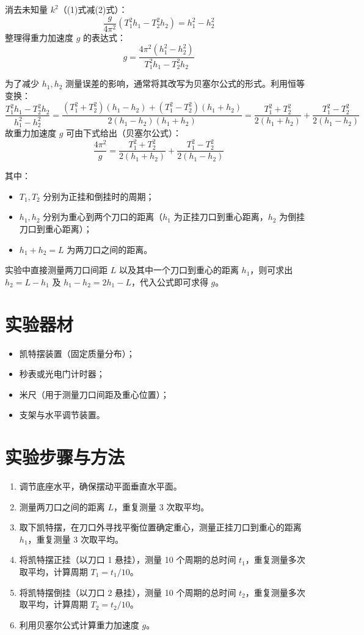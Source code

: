 \documentclass[12pt,a4paper]{article}
\begin{document}
消去未知量 $k^2$（(1)式减(2)式）：
\[ \frac{g}{4\pi^2} (T_1^2 h_1 - T_2^2 h_2) = h_1^2 - h_2^2 \]
整理得重力加速度 $g$ 的表达式：
\[ g = \frac{4\pi^2 (h_1^2 - h_2^2)}{T_1^2 h_1 - T_2^2 h_2} \]

为了减少 $h_1, h_2$ 测量误差的影响，通常将其改写为贝塞尔公式的形式。利用恒等变换：
\[ \frac{T_1^2 h_1 - T_2^2 h_2}{h_1^2 - h_2^2} = \frac{(T_1^2 + T_2^2)(h_1 - h_2) + (T_1^2 - T_2^2)(h_1 + h_2)}{2(h_1 - h_2)(h_1 + h_2)} = \frac{T_1^2 + T_2^2}{2(h_1 + h_2)} + \frac{T_1^2 - T_2^2}{2(h_1 - h_2)} \]
故重力加速度 $g$ 可由下式给出（贝塞尔公式）：
\[ \frac{4\pi^2}{g} = \frac{T_1^2 + T_2^2}{2(h_1 + h_2)} + \frac{T_1^2 - T_2^2}{2(h_1 - h_2)} \]

其中：
\begin{itemize}
    \item $T_1, T_2$ 分别为正挂和倒挂时的周期；
    \item $h_1, h_2$ 分别为重心到两个刀口的距离（$h_1$ 为正挂刀口到重心距离，$h_2$ 为倒挂刀口到重心距离）；
    \item $h_1 + h_2 = L$ 为两刀口之间的距离。
\end{itemize}
实验中直接测量两刀口间距 $L$ 以及其中一个刀口到重心的距离 $h_1$，则可求出 $h_2 = L - h_1$ 及 $h_1 - h_2 = 2h_1 - L$，代入公式即可求得 $g$。

\section{实验器材}
\begin{itemize}
    \item 凯特摆装置（固定质量分布）；
    \item 秒表或光电门计时器；
    \item 米尺（用于测量刀口间距及重心位置）；
    \item 支架与水平调节装置。
\end{itemize}

\section{实验步骤与方法}
\begin{enumerate}
    \item 调节底座水平，确保摆动平面垂直水平面。
    \item 测量两刀口之间的距离 $L$，重复测量 3 次取平均。
    \item 取下凯特摆，在刀口外寻找平衡位置确定重心，测量正挂刀口到重心的距离 $h_1$，重复测量 3 次取平均。
    \item 将凯特摆正挂（以刀口 1 悬挂），测量 10 个周期的总时间 $t_1$，重复测量多次取平均，计算周期 $T_1 = t_1/10$。
    \item 将凯特摆倒挂（以刀口 2 悬挂），测量 10 个周期的总时间 $t_2$，重复测量多次取平均，计算周期 $T_2 = t_2/10$。
    \item 利用贝塞尔公式计算重力加速度 $g$。
\end{enumerate}
\end{document}
